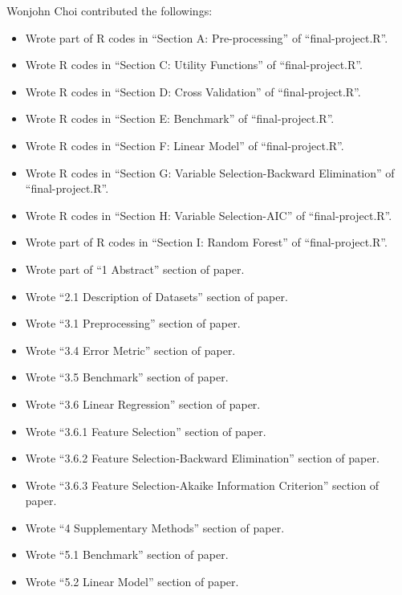 \documentclass[letterpaper,twocolumn,11pt]{article}
\begin{document}
Wonjohn Choi contributed the followings:
\begin{itemize}
\item Wrote part of R codes in ``Section A: Pre-processing'' of ``final-project.R''.
\item Wrote R codes in ``Section C: Utility Functions'' of ``final-project.R''.
\item Wrote R codes in ``Section D: Cross Validation'' of ``final-project.R''.
\item Wrote R codes in ``Section E: Benchmark'' of ``final-project.R''.
\item Wrote R codes in ``Section F: Linear Model'' of ``final-project.R''.
\item Wrote R codes in ``Section G: Variable Selection-Backward Elimination'' of ``final-project.R''.
\item Wrote R codes in ``Section H: Variable Selection-AIC'' of ``final-project.R''.
  \item Wrote part of R codes in ``Section I: Random Forest'' of ``final-project.R''.
  
\item Wrote part of ``1 Abstract'' section of paper.
\item Wrote ``2.1 Description of Datasets'' section of paper.
\item Wrote ``3.1 Preprocessing'' section of paper.
\item Wrote ``3.4 Error Metric'' section of paper.
\item Wrote ``3.5 Benchmark'' section of paper.
\item Wrote ``3.6 Linear Regression'' section of paper.
\item Wrote ``3.6.1 Feature Selection'' section of paper.
\item Wrote ``3.6.2 Feature Selection-Backward Elimination'' section of paper.
\item Wrote ``3.6.3 Feature Selection-Akaike Information Criterion'' section of paper.
\item Wrote ``4 Supplementary Methods'' section of paper.
\item Wrote ``5.1 Benchmark'' section of paper.
\item Wrote ``5.2 Linear Model'' section of paper.
  
  
\end{itemize}
\end{document}
